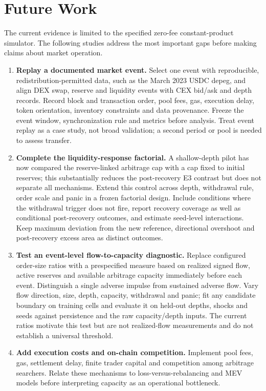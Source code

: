 \chapter{Future Work}
\label{cap:futuro}

The current evidence is limited to the specified zero-fee constant-product simulator. The following studies address the most important gaps before making claims about market operation.

\begin{enumerate}
  \item \textbf{Replay a documented market event.} Select one event with reproducible, redistribution-permitted data, such as the March 2023 USDC depeg, and align DEX swap, reserve and liquidity events with CEX bid/ask and depth records. Record block and transaction order, pool fees, gas, execution delay, token orientation, inventory constraints and data provenance. Freeze the event window, synchronization rule and metrics before analysis. Treat event replay as a case study, not broad validation; a second period or pool is needed to assess transfer.
  \item \textbf{Complete the liquidity-response factorial.} A shallow-depth pilot has now compared the reserve-linked arbitrage cap with a cap fixed to initial reserves; this substantially reduces the post-recovery E3 contrast but does not separate all mechanisms. Extend this control across depth, withdrawal rule, order scale and panic in a frozen factorial design. Include conditions where the withdrawal trigger does not fire, report recovery coverage as well as conditional post-recovery outcomes, and estimate seed-level interactions. Keep maximum deviation from the new reference, directional overshoot and post-recovery excess area as distinct outcomes.
  \item \textbf{Test an event-level flow-to-capacity diagnostic.} Replace configured order-size ratios with a prespecified measure based on realized signed flow, active reserves and available arbitrage capacity immediately before each event. Distinguish a single adverse impulse from sustained adverse flow. Vary flow direction, size, depth, capacity, withdrawal and panic; fit any candidate boundary on training cells and evaluate it on held-out depths, shocks and seeds against persistence and the raw capacity/depth inputs. The current ratios motivate this test but are not realized-flow measurements and do not establish a universal threshold.
  \item \textbf{Add execution costs and on-chain competition.} Implement pool fees, gas, settlement delay, finite trader capital and competition among arbitrage searchers. Relate these mechanisms to loss-versus-rebalancing and MEV models before interpreting capacity as an operational bottleneck.

\end{enumerate}
